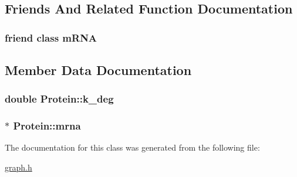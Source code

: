 \subsection{Friends And Related Function Documentation}
\hypertarget{class_protein_a904bf77ec17baad950eb63ea5c40c6ea}{
\subsubsection[{m\-R\-N\-A}]{\setlength{\rightskip}{0pt plus 5cm}friend class {\bf m\-R\-N\-A}\hspace{0.3cm}{\ttfamily [friend]}}}\label{class_protein_a904bf77ec17baad950eb63ea5c40c6ea}


\subsection{Member Data Documentation}
\hypertarget{class_protein_a21c7f43c3a4e313b02e93f8b682a2074}{
\subsubsection[{k\-\_\-deg}]{\setlength{\rightskip}{0pt plus 5cm}double Protein\-::k\-\_\-deg\hspace{0.3cm}{\ttfamily [private]}}}\label{class_protein_a21c7f43c3a4e313b02e93f8b682a2074}
\hypertarget{class_protein_a28268d2851fd44eee68754d45301d6e1}{
\subsubsection[{mrna}]{$\ast$ Protein\-::mrna\hspace{0.3cm}{\ttfamily [private]}}}\label{class_protein_a28268d2851fd44eee68754d45301d6e1}


The documentation for this class was generated from the following file\-:\begin{DoxyCompactItemize}
\item 
\hyperlink{graph_8h}{graph.\-h}\end{DoxyCompactItemize}
